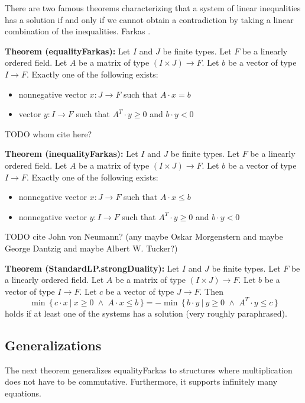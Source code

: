 \documentclass[]{article}
\renewcommand{\.}{\hskip .75pt}
\DeclareMathOperator{\aand}{\;\wedge\;}
\let\r=\rightarrow
\let\*=\cdot
\begin{document}
There are two famous theorems characterizing that a system of linear inequalities
has a solution if and only if we cannot obtain a contradiction
by taking a linear combination of the inequalities.
Farkas \cite{FarkasOrig}.

\medskip \noindent
\textbf{Theorem (equalityFarkas):}
Let $I$ and $J$ be finite types.
Let $F$ be a linearly ordered field.
Let $A$ be a matrix of type $(I \times J) \r F$.
Let $b$ be a vector of type $I \r F$.
Exactly one of the following exists:
\begin{itemize}
\item nonnegative vector $x : J \r F$ such that $A \* x = b$
\item vector $y : I \r F$ such that $A^T\! \* y \ge 0$ and $b \* y < 0$
\end{itemize}
TODO whom cite here?

\medskip \noindent
\textbf{Theorem (inequalityFarkas):}
Let $I$ and $J$ be finite types.
Let $F$ be a linearly ordered field.
Let $A$ be a matrix of type $(I \times J) \r F$.
Let $b$ be a vector of type $I \r F$.
Exactly one of the following exists:
\begin{itemize}
\item nonnegative vector $x : J \r F$ such that $A \* x \le b$
\item nonnegative vector $y : I \r F$ such that $A^T\! \* y \ge 0$ and $b \* y < 0$
\end{itemize}
TODO cite John von Neumann?
(any maybe Oskar Morgenstern and maybe George Dantzig and maybe Albert W. Tucker?)

\medskip \noindent
\textbf{Theorem (StandardLP.strongDuality):}
Let $I$ and $J$ be finite types.
Let $F$ be a linearly ordered field.
Let $A$ be a matrix of type $(I \times J) \r F$.
Let $b$ be a vector of type $I \r F$.
Let $c$ be a vector of type $J \r F$.
Then
$$ \min \,\{\, c \* x ~|~ x \ge 0 \aand A \* x \le b \,\}
=- \min \,\{\, b \* y ~|~ y \ge 0 \aand A^T\! \* y \le c \,\}
$$
holds if at least one of the systems has a solution
(very roughly paraphrased).


\subsection{Generalizations}
\label{generalizations}

The next theorem generalizes equalityFarkas to structures where
multiplication does not have to be commutative.
Furthermore, it supports infinitely many equations.
\end{document}
